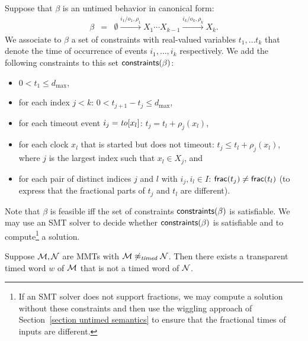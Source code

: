 Suppose that $\beta$ is an untimed behavior in canonical form:
\begin{eqnarray*}
\beta & = & \emptyset \xrightarrow{i_1/o_1, \rho_1} X_1  \cdots X_{k-1} \xrightarrow{i_k/o_k, \rho_k} X_k.
\end{eqnarray*}
We associate to $\beta$ a set of constraints with real-valued variables $t_1 ,\ldots t_k$ that denote the time of
occurrence of events $i_1 ,\ldots, i_k$ respectively. We add the following constraints to this set $\mathsf{constraints}({\beta})$:
\begin{itemize}
\item
$0 < t_1 \leq d_{\max}$,
\item
for each index $j < k$:  $0 <  t_{j+1} - t_j \leq d_{\max}$,
\item
for each timeout event $i_j = \mathit{to}[x_l]$: $t_j = t_l + \rho_j(x_l)$,
\item
for each clock $x_l$ that is started but does not timeout: $t_j \leq t_l + \rho_j(x_l)$,
where $j$ is the largest index such that $x_l \in X_j$, and
\item
for each pair of distinct indices $j$ and $l$ with $i_j, i_l \in I$: $\mathsf{frac}({t_j}) \neq \mathsf{frac}({t_l})$ 
(to express that the fractional parts of $t_j$ and $t_l$ are different).
\end{itemize}
Note that $\beta$ is feasible iff the set of constraints $\mathsf{constraints}({\beta})$ is satisfiable.
We may use an SMT solver to decide whether $\mathsf{constraints}({\beta})$ is satisfiable and to compute\footnote{If an SMT solver
does not support fractions, we may compute a solution without these constraints and then use the wiggling approach
of Section~\ref{section untimed semantics} to ensure that the fractional times of inputs are different.} a solution.


\begin{lemma}
\label{not timed}
Suppose ${\mathcal M}, {\mathcal N}$ are MMTs with ${\mathcal M} \not\approx_{\mathit{timed}} {\mathcal N}$.
Then there exists a transparent timed word $w$ of ${\mathcal M}$ that is not a timed word of ${\mathcal N}$.
\end{lemma}

